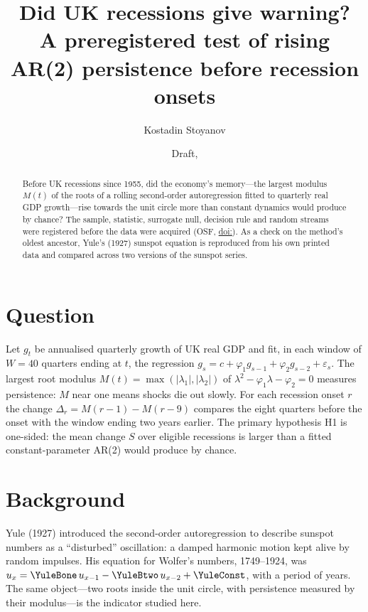 \documentclass[11pt,a4paper]{article}
\title{Did UK recessions give warning?\\[2pt]\large A preregistered test of rising AR(2) persistence before recession onsets}
\author{Kostadin Stoyanov}
\date{Draft, \notedate}
\begin{document}
\maketitle

\begin{abstract}
\noindent Before UK recessions since 1955, did the economy's memory---the largest modulus $M(t)$ of the roots of a rolling second-order autoregression fitted to quarterly real GDP growth---rise towards the unit circle more than constant dynamics would produce by chance? The sample, statistic, surrogate null, decision rule and random streams were registered before the data were acquired (OSF, \href{https://doi.org/\DOI}{doi:\DOI}). \HoneConclusion{} As a check on the method's oldest ancestor, Yule's (1927) sunspot equation is reproduced from his own printed data and compared across two versions of the sunspot series.
\end{abstract}

\section{Question}

Let $g_t$ be annualised quarterly growth of UK real GDP and fit, in each window of $W=40$ quarters ending at $t$, the regression $g_s = c + \varphi_1 g_{s-1} + \varphi_2 g_{s-2} + \varepsilon_s$. The largest root modulus $M(t)=\max(|\lambda_1|,|\lambda_2|)$ of $\lambda^2-\varphi_1\lambda-\varphi_2=0$ measures persistence: $M$ near one means shocks die out slowly. For each recession onset $r$ the change $\Delta_r = M(r-1)-M(r-9)$ compares the eight quarters before the onset with the window ending two years earlier. The primary hypothesis H1 is one-sided: the mean change $S$ over eligible recessions is larger than a fitted constant-parameter AR(2) would produce by chance.

\section{Background}

Yule (1927) introduced the second-order autoregression to describe sunspot numbers as a ``disturbed'' oscillation: a damped harmonic motion kept alive by random impulses. His equation for Wolfer's numbers, 1749--1924, was $u_x = \YuleBone\,u_{x-1} - \YuleBtwo\,u_{x-2} + \YuleConst$, with a period of \YulePeriod{} years. The same object---two roots inside the unit circle, with persistence measured by their modulus---is the indicator studied here.
\end{document}
